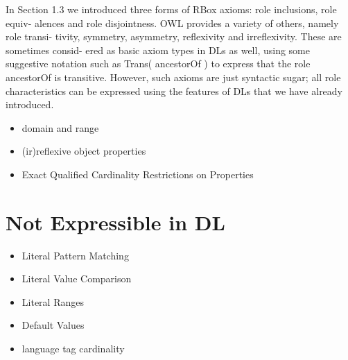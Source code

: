 \documentclass{llncs}
\begin{document}
In Section 1.3 we introduced three forms of RBox axioms: role inclusions, role equiv-
alences and role disjointness. OWL provides a variety of others, namely role transi-
tivity, symmetry, asymmetry, reflexivity and irreflexivity. These are sometimes consid-
ered as basic axiom types in DLs as well, using some suggestive notation such as
Trans( ancestorOf ) to express that the role ancestorOf is transitive. However, such axioms
are just syntactic sugar; all role characteristics can be expressed using the features
of DLs that we have already introduced.

\begin{itemize}
  \item domain and range
	\item (ir)reflexive object properties
	\item Exact Qualified Cardinality Restrictions on Properties
\end{itemize}

\section{Not Expressible in DL}

\begin{itemize}
	\item Literal Pattern Matching
	\item Literal Value Comparison
	\item Literal Ranges
	\item Default Values
	\item language tag cardinality
\end{itemize}

{}

\setcounter{tocdepth}{1}
\end{document}
